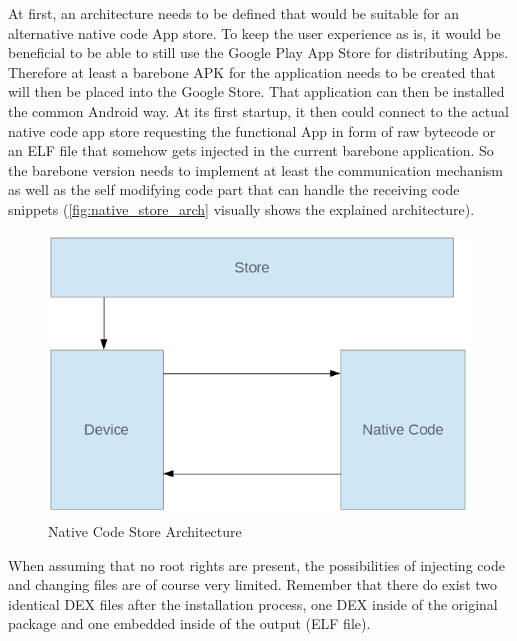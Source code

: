 At first, an architecture needs to be defined that would be suitable for an alternative native code App store. To keep the user experience as is, it would be beneficial to be able to still use the Google Play App Store for distributing Apps. Therefore at least a barebone APK for the application needs to be created that will then be placed into the Google Store.
That application can then be installed the common Android way. At its first startup, it then could connect to the actual native code app store
requesting the functional App in form of raw bytecode or an ELF file that
somehow gets injected in the current barebone application.
So the barebone version needs to implement at least the communication mechanism as well as the self modifying code part that can handle the receiving code snippets (\autoref{fig:native_store_arch} visually shows
the explained architecture).
\begin{figure}[htb]
  \centering
  \includegraphics[scale=0.5]{figures/native_store_arch}
  \caption[Native Code Store Architecture]{Native Code Store Architecture}
  \label{fig:native_store_arch}
\end{figure}
When assuming that no root rights are present, the possibilities of injecting code and changing files are of course very limited. Remember that there do exist
two identical DEX files after the installation process, one DEX inside of the original  package and one embedded inside of the 
output (ELF file). 

